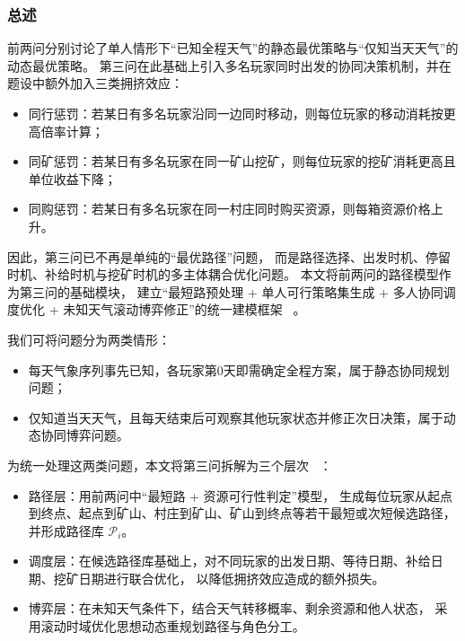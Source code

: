 \subsubsection{总述}

前两问分别讨论了单人情形下“已知全程天气”的静态最优策略与“仅知当天天气”的动态最优策略。
%
第三问在此基础上引入多名玩家同时出发的协同决策机制，并在题设中额外加入三类拥挤效应：

\begin{itemize}
    \item 同行惩罚：若某日有多名玩家沿同一边同时移动，则每位玩家的移动消耗按更高倍率计算；
    \item 同矿惩罚：若某日有多名玩家在同一矿山挖矿，则每位玩家的挖矿消耗更高且单位收益下降；
    \item 同购惩罚：若某日有多名玩家在同一村庄同时购买资源，则每箱资源价格上升。
\end{itemize}

因此，第三问已不再是单纯的“最优路径”问题，
%
而是路径选择、出发时机、停留时机、补给时机与挖矿时机的多主体耦合优化问题。
%
本文将前两问的路径模型作为第三问的基础模块，
%
建立“最短路预处理 + 单人可行策略集生成 + 多人协同调度优化 + 未知天气滚动博弈修正”的统一建模框架 ~\cite{065d5381875d421d8b8d7da4d256f90c, LEVY201846}。

我们可将问题分为两类情形：

\begin{itemize}
    \item 每天气象序列事先已知，各玩家第0天即需确定全程方案，属于静态协同规划问题；
    \item 仅知道当天天气，且每天结束后可观察其他玩家状态并修正次日决策，属于动态协同博弈问题。
\end{itemize}

为统一处理这两类问题，本文将第三问拆解为三个层次 ~\cite{Khalifa2023Multi}：

\begin{itemize}
    \item 路径层：用前两问中“最短路 + 资源可行性判定”模型，
        生成每位玩家从起点到终点、起点到矿山、村庄到矿山、矿山到终点等若干最短或次短候选路径，
        并形成路径库 $\mathcal P_i$。
    \item 调度层：在候选路径库基础上，对不同玩家的出发日期、等待日期、补给日期、挖矿日期进行联合优化，
        以降低拥挤效应造成的额外损失。
    \item 博弈层：在未知天气条件下，结合天气转移概率、剩余资源和他人状态，
        采用滚动时域优化思想动态重规划路径与角色分工。
\end{itemize}

